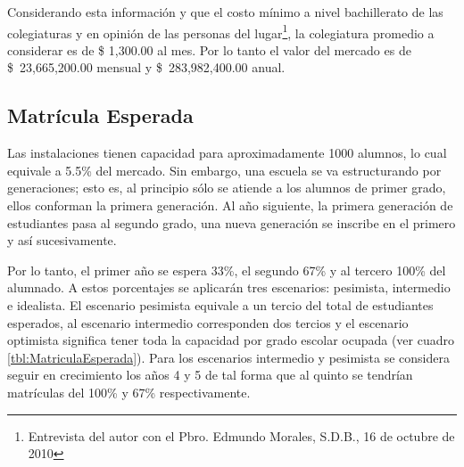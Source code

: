 Considerando esta información y que el costo mínimo a nivel bachillerato de las colegiaturas y en opinión de las personas del lugar\footnote{Entrevista del autor con el Pbro. Edmundo Morales, S.D.B., 16 de octubre de 2010}, la colegiatura promedio a considerar es de \$ 1,300.00 al mes. Por lo tanto el valor del mercado es de \$~23,665,200.00 mensual y \$~283,982,400.00 anual.

\subsection{Matrícula Esperada}

Las instalaciones tienen capacidad para aproximadamente 1000 alumnos, lo cual equivale a 5.5\% del mercado. Sin embargo, una escuela se va estructurando por generaciones; esto es, al principio sólo se atiende a los alumnos de primer grado, ellos conforman la primera generación. Al año siguiente, la primera generación de estudiantes pasa al segundo grado, una nueva generación se inscribe en el primero y así sucesivamente.

Por lo tanto, el primer año se espera 33\%, el segundo 67\% y al tercero 100\% del alumnado. A estos porcentajes se aplicarán tres escenarios: pesimista, intermedio e idealista. El escenario pesimista equivale a un tercio del total de estudiantes esperados, al escenario intermedio corresponden dos tercios y el escenario optimista significa tener toda la capacidad por grado escolar ocupada (ver cuadro \ref{tbl:MatriculaEsperada}). Para los escenarios intermedio y pesimista se considera seguir en crecimiento los años 4 y 5 de tal forma que al quinto se tendrían matrículas del 100\% y 67\% respectivamente.







\clearpage
